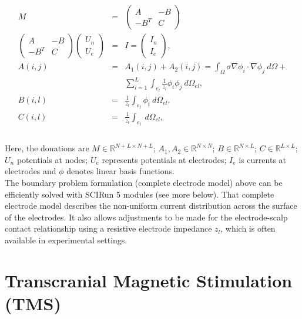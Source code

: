 \documentclass[fleqn,11pt,openany]{book}
\begin{document}
\begin{eqnarray}
M &=& \left( \begin{array}{cc}
A & -B \\
-B^{T} & C
\end{array} \right) \nonumber \\
\left( \begin{array}{cc}
A & -B \\
-B^{T} & C
\end{array} \right) 
\left(
\begin{array}{c}
U_{n} \\
U_{e}
\end{array}
\right) &=& I =
\left(
\begin{array}{c}
I_{n} \\
I_{e}
\end{array}
\right) \nonumber, \\
A(i,j) &=& A_{1}(i,j) + A_{2}(i,j) = \int_{\Omega} \sigma \nabla \phi_{i} \cdot \nabla
\phi_{j}\ d\Omega + \nonumber \\
& & \sum_{l=1}^{L} \int_{e_{l}} \frac{1}{z_l} \phi_{i}
\phi_{j}\ d\Omega_{el}, \nonumber \\
B(i,l) &=& \frac{1}{z_{l}} \int_{e_l} \phi_{i}\ d\Omega_{el}
\nonumber, \\
C(i,l) &=& \frac{1}{z_{l}} \int_{e_l}\ d\Omega_{el}, \nonumber \\ \nonumber \\
\end{eqnarray}

Here, the donations are $M \in \mathbb{R}^{N+L \times N+L}$; $A_{1},A_{2} \in \mathbb{R}^{N \times N}$; $B \in \mathbb{R}^{N \times L}$; $C \in \mathbb{R}^{L \times L}$; $U_n$ potentials at nodes; $U_e$ represents potentials at electrodes; $I_{e}$ is currents at electrodes and $\phi$ denotes linear basis functions. \\

The boundary problem formulation (complete electrode model) above can be efficiently solved with SCIRun 5 modules (see more below).
That complete electrode model describes the non-uniform current distribution across the surface of the electrodes. It also allows adjustments to be made for the electrode-scalp contact relationship using a resistive electrode impedance $z_{l}$, which is often available in experimental settings.

\section{Transcranial Magnetic Stimulation (TMS)}
\end{document}
